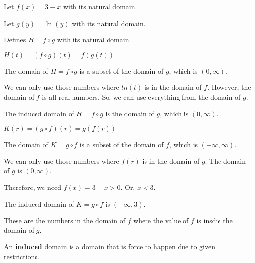 \documentclass{ximera}
\begin{document}
\begin{example}


Let $f(x) = 3 - x$ with its natural domain.


Let $g(y) = \ln(y)$ with its natural domain.


Defines $H = f \circ g$ with its natural domain.



\begin{explanation}


$H(t) = (f \circ g)(t) = f(g(t))$


The domain of $H = f \circ g$ is a subset of the domain of $g$, which is $(0, \infty)$.  

We can only use those numbers where $ln(t)$ is in the domain of $f$.  However, the domain of $f$ is all real numbers.  So, we can use everything from the domain of $g$.

The induced domain of $H = f \circ g$ is the domain of $g$, which is $(0, \infty)$. 




\end{explanation}







\begin{explanation}


$K(r) = (g \circ f)(r) = g(f(r))$


The domain of $K = g \circ f$ is a subset of the domain of $f$, which is $(-\infty, \infty)$.  

We can only use those numbers where $f(r)$ is in the domain of $g$.  The domain of $g$ is $(0, \infty)$.  

Therefore, we need $f(x) = 3 - x > 0$.  Or, $x < 3$.

The induced domain of $K = g \circ f$ is $(-\infty, 3)$. 

These are the numbers in the domain of $f$ where the value of $f$ is insdie the domain of $g$.


\end{explanation}




\end{example}


An \textbf{induced} domain is a domain that is force to happen due to given restrictions. \\
\end{document}
